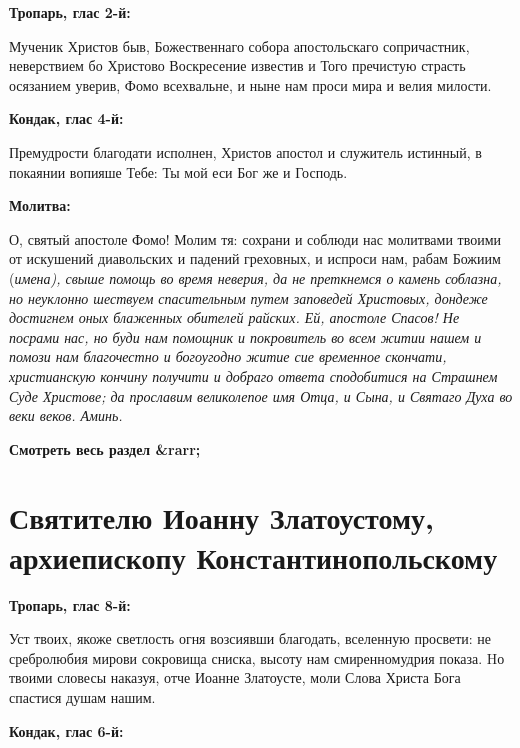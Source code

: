 \bfseries Тропарь, глас 2-й:\normalfont{}


Мученик Христов быв, Божественнаго собора апостольскаго сопричастник, неверствием бо Христово Воскресение известив и Того пречистую страсть осязанием уверив, Фомо всехвальне, и ныне нам проси мира и велия милости.


\medskip


\bfseries Кондак, глас 4-й:\normalfont{}


Премудрости благодати исполнен, Христов апостол и служитель истинный, в покаянии вопияше Тебе: Ты мой еси Бог же и Господь.


\medskip


\bfseries Молитва:\normalfont{}


О, святый апостоле Фомо! Молим тя: сохрани и соблюди нас молитвами твоими от искушений диавольских и падений греховных, и испроси нам, рабам Божиим (\itshape имена\normalfont{}), свыше помощь во время неверия, да не преткнемся о камень соблазна, но неуклонно шествуем спасительным путем заповедей Христовых, дондеже достигнем оных блаженных обителей райских. Ей, апостоле Спасов! Не посрами нас, но буди нам помощник и покровитель во всем житии нашем и помози нам благочестно и богоугодно житие сие временное скончати, христианскую кончину получити и добраго ответа сподобитися на Страшнем Суде Христове; да прославим великолепое имя Отца, и Сына, и Святаго Духа во веки веков. Аминь.


\mychapterending


\bfseries Смотреть весь раздел &rarr;\normalfont{} 

\section{Святителю Иоанну Златоустому, архиепископу Константинопольскому}
 


\bfseries Тропарь, глас 8-й:\normalfont{}


Уст твоих, якоже светлость огня возсиявши благодать, вселенную просвети: не сребролюбия мирови сокровища сниска, высоту нам смиренномудрия показа. Hо твоими словесы наказуя, отче Иоанне Златоусте, моли Слова Христа Бога спастися душам нашим.


\medskip


\bfseries Кондак, глас 6-й:\normalfont{}


